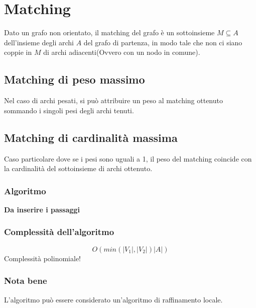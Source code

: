 \chapter{Matching}

Dato un grafo non orientato, il matching del grafo è un sottoinsieme $M \subseteq A$ dell'insieme degli 
archi $A$ del grafo di partenza, in modo tale che non ci siano coppie in $M$ di archi adiacenti(Ovvero con un nodo in comune).

\section{Matching di peso massimo}

Nel caso di archi pesati, si può attribuire un peso al matching ottenuto sommando 
i singoli pesi degli archi tenuti. 

\section{Matching di cardinalità massima}

Caso particolare dove se i pesi sono uguali a 1, il peso del matching coincide con la cardinalità del
sottoinsieme di archi ottenuto. 


\subsection{Algoritmo}
\textbf{Da inserire i passaggi}

\subsection{Complessità dell'algoritmo}
\begin{equation}
  O(min(|V_1|,|V_2|)|A|)
\end{equation}
Complessità polinomiale!


\subsection{Nota bene}
L'algoritmo può essere considerato un'algoritmo di raffinamento locale. 

